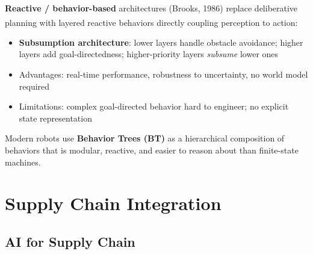 \begin{tcbitemize}[ skin=sectionraster ]
    \tcbitem[title={Behavior-Based Robotics}, raster multicolumn=3]
    \textbf{Reactive / behavior-based} architectures (Brooks, 1986) replace deliberative planning with layered reactive behaviors directly coupling perception to action\textsuperscript{\cite[][pp.~120--130]{benariElementsRobotics2017}}:
    \begin{itemize}
        \item \textbf{Subsumption architecture}: lower layers handle obstacle avoidance; higher layers add goal-directedness; higher-priority layers \emph{subsume} lower ones
        \item Advantages: real-time performance, robustness to uncertainty, no world model required
        \item Limitations: complex goal-directed behavior hard to engineer; no explicit state representation
    \end{itemize}
    Modern robots use \textbf{Behavior Trees (BT)} as a hierarchical composition of behaviors that is modular, reactive, and easier to reason about than finite-state machines.
\end{tcbitemize}

\section{Supply Chain Integration}

\subsection{AI for Supply Chain}

